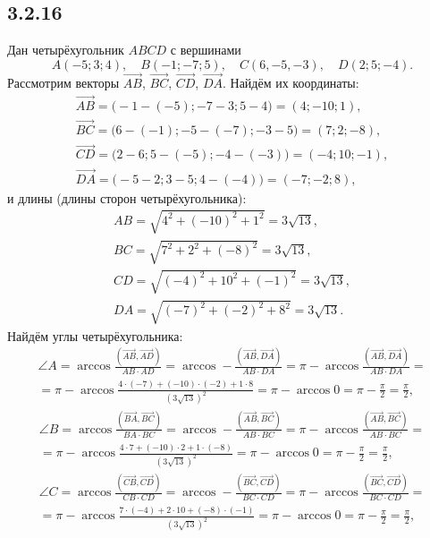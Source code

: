 \subsection{3.2.16}

Дан четырёхугольник $ABCD$ с вершинами
\[
A(-5;3;4),\quad B(-1;-7;5),\quad C(6,-5,-3),\quad D(2;5;-4).
\]
Рассмотрим векторы $\overrightarrow{AB}$, $\overrightarrow{BC}$, $\overrightarrow{CD}$, $\overrightarrow{DA}$. Найдём их координаты:
\begin{gather*}
\overrightarrow{AB}=\bigl(-1-(-5);-7-3;5-4\bigr)=(4;-10;1), \\
\overrightarrow{BC}=\bigr(6-(-1);-5-(-7);-3-5\bigl)=(7;2;-8), \\
\overrightarrow{CD}=\bigr(2-6;5-(-5);-4-(-3)\bigl)=(-4;10;-1), \\
\overrightarrow{DA}=\bigl(-5-2;3-5;4-(-4)\bigr)=(-7;-2;8),
\end{gather*}
и длины (длины сторон четырёхугольника):
\begin{gather*}
AB=\sqrt{4^2+(-10)^2+1^2}=3\sqrt{13}, \\
BC=\sqrt{7^2+2^2+(-8)^2}=3\sqrt{13}, \\
CD=\sqrt{(-4)^2+10^2+(-1)^2}=3\sqrt{13}, \\
DA=\sqrt{(-7)^2+(-2)^2+8^2}=3\sqrt{13}.
\end{gather*}
Найдём углы четырёхугольника:
\begin{multline*}
\angle A=\arccos\frac{\left(\overrightarrow{AB},\overrightarrow{AD}\right)}{AB\cdot AD}=\arccos-\frac{\left(\overrightarrow{AB},\overrightarrow{DA}\right)}{AB\cdot DA}=\pi-\arccos\frac{\left(\overrightarrow{AB},\overrightarrow{DA}\right)}{AB\cdot DA}= \\
=\pi-\arccos\frac{4\cdot(-7)+(-10)\cdot(-2)+1\cdot8}{\left(3\sqrt{13}\right)^2}=\pi-\arccos0=\pi-\frac{\pi}{2}=\frac{\pi}{2},
\end{multline*}
\begin{multline*}
\angle B=\arccos\frac{\left(\overrightarrow{BA},\overrightarrow{BC}\right)}{BA\cdot BC}=\arccos-\frac{\left(\overrightarrow{AB},\overrightarrow{BC}\right)}{AB\cdot BC}=\pi-\arccos\frac{\left(\overrightarrow{AB},\overrightarrow{BC}\right)}{AB\cdot BC}= \\
=\pi-\arccos\frac{4\cdot7+(-10)\cdot2+1\cdot(-8)}{\left(3\sqrt{13}\right)^2}=\pi-\arccos0=\pi-\frac{\pi}{2}=\frac{\pi}{2},
\end{multline*}
\begin{multline*}
\angle C=\arccos\frac{\left(\overrightarrow{CB},\overrightarrow{CD}\right)}{CB\cdot CD}=\arccos-\frac{\left(\overrightarrow{BC},\overrightarrow{CD}\right)}{BC\cdot CD}=\pi-\arccos\frac{\left(\overrightarrow{BC},\overrightarrow{CD}\right)}{BC\cdot CD}= \\
=\pi-\arccos\frac{7\cdot(-4)+2\cdot10+(-8)\cdot(-1)}{\left(3\sqrt{13}\right)^2}=\pi-\arccos0=\pi-\frac{\pi}{2}=\frac{\pi}{2},
\end{multline*}
